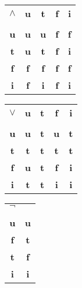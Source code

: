 \documentclass{tlp}
\begin{document}
\begin{center}
\begin{minipage}{0.38\textwidth}
\begin{tabular}{|c||c|c|c|c|}
\cline{1-5}
$\wedge$ & \textbf{u} & \textbf{t} & \textbf{f} & \textbf{i}\\
\cline{1-5}
\vspace{-3.9mm} & & & & \\
\cline{1-5}
\textbf{u}          & \textbf{u} & \textbf{u} & \textbf{f} & \textbf{f}\\
\cline{1-5}
\textbf{t}          & \textbf{u} & \textbf{t} & \textbf{f} & \textbf{i}\\
\cline{1-5}
\textbf{f}          & \textbf{f} & \textbf{f} & \textbf{f} & \textbf{f}\\
\cline{1-5}
\textbf{i}          & \textbf{f} & \textbf{i} & \textbf{f} & \textbf{i}\\
\cline{1-5}
\end{tabular}
\end{minipage}
\begin{minipage}{0.38\textwidth}
\begin{tabular}{|c||c|c|c|c|}
\cline{1-5}
$\vee$ & \textbf{u} & \textbf{t} & \textbf{f} & \textbf{i}\\
\cline{1-5}
\vspace{-3.9mm} & & & & \\
\cline{1-5}
\textbf{u}        & \textbf{u} & \textbf{t} & \textbf{u} & \textbf{t}\\
\cline{1-5}
\textbf{t}        & \textbf{t} & \textbf{t} & \textbf{t} & \textbf{t}\\
\cline{1-5}
\textbf{f}        & \textbf{u} & \textbf{t} & \textbf{f} & \textbf{i}\\
\cline{1-5}
\textbf{i}        & \textbf{t} & \textbf{t} & \textbf{i} & \textbf{i}\\
\cline{1-5}
\end{tabular}
\end{minipage}
\begin{minipage}{0.19\textwidth}
\begin{tabular}{|c||c|}
\cline{1-2}
   $\neg$ &
\\ \cline{1-2}
\vspace{-3.9mm} &
\\ \cline{1-2}
   \textbf{u} & \textbf{u}
\\ \cline{1-2}
   \textbf{f} & \textbf{t}
\\ \cline{1-2}
   \textbf{t} & \textbf{f}
\\ \cline{1-2}
   \textbf{i} & \textbf{i}
\\ \cline{1-2}
\end{tabular}
\end{minipage}
\medskip
\end{center}
\end{document}
